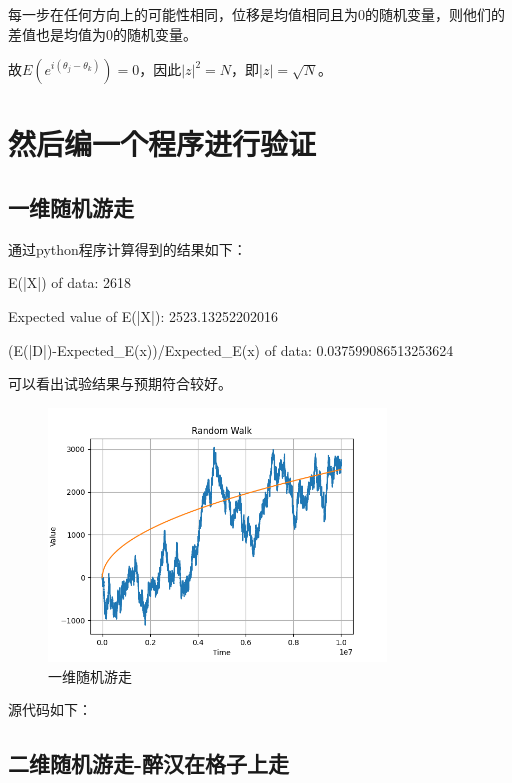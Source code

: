 \documentclass{article}
\begin{document}
每一步在任何方向上的可能性相同，位移是均值相同且为0的随机变量，则他们的差值也是均值为0的随机变量。

故$E(e^{i(\theta_j-\theta_k)})=0$，因此$|z|^2=N$，即$|z|=\sqrt{N}$。

\section{然后编一个程序进行验证}

\subsection{一维随机游走}

通过python程序计算得到的结果如下：

E(|X|) of data: 2618

Expected value of E(|X|): 2523.13252202016

(E(|D|)-Expected\_E(x))/Expected\_E(x) of data: 0.037599086513253624

可以看出试验结果与预期符合较好。

\begin{figure}[H]
    \centering
    \includegraphics[width=0.8\textwidth]{img/Figure_1D.png}
    \caption{一维随机游走}
\end{figure}

源代码如下：



\subsection{二维随机游走-醉汉在格子上走}
\end{document}

